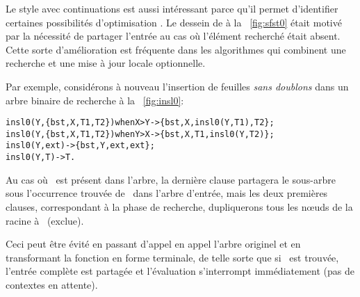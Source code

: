  Le style
avec continuations est aussi intéressant parce qu'il permet
d'identifier certaines possibilités d'optimisation
\citep{Danvy_2004}. Le dessein de  à la
\fig~\vref{fig:sfst0} était motivé par la nécessité de partager
l'entrée au cas où l'élément recherché était absent. Cette sorte
d'amélioration est fréquente dans les algorithmes qui combinent une
recherche et une mise à jour locale optionnelle.

Par exemple, considérons à nouveau l'insertion de feuilles \emph{sans
doublons} dans un arbre binaire de recherche à la \fig~\vref{fig:insl0}:
\begin{alltt}
insl0(Y,\{bst,X,T1,T2\}) when X > Y -> \{bst,X,insl0(Y,T1),T2\};
insl0(Y,\{bst,X,T1,T2\}) when Y > X -> \{bst,X,T1,insl0(Y,T2)\};
insl0(Y,          ext)            -> \{bst,Y,ext,ext\};
insl0(Y,            T)            -> T.
\end{alltt}
Au cas où ~est présent dans l'arbre, la dernière clause
partagera le sous-arbre sous l'occurrence trouvée de~ dans
l'arbre d'entrée, mais les deux premières clauses, correspondant à la
phase de recherche, dupliquerons tous les nœuds de la racine
à~ (exclue).

Ceci peut être évité en passant d'appel en appel l'arbre originel et
en transformant la fonction en forme terminale, de telle sorte que
si~ est trouvée, l'entrée complète est partagée et
l'évaluation s'interrompt immédiatement (pas de contextes en attente).

